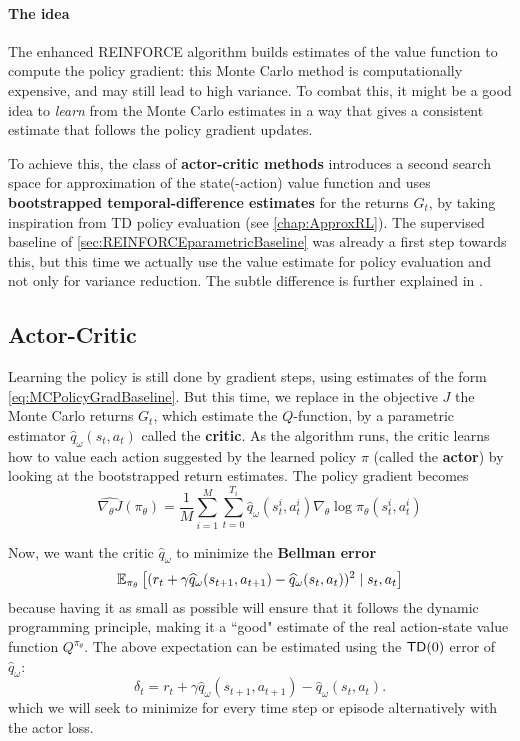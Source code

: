 \documentclass[../course-notes.tex]{subfiles}
\begin{document}
\paragraph{The idea} The enhanced REINFORCE algorithm builds estimates of the value function to compute the policy gradient: this Monte Carlo method is computationally expensive, and may still lead to high variance. To combat this, it might be a good idea to \textit{learn} from the Monte Carlo estimates in a way that gives a consistent estimate that follows the policy gradient updates.

To achieve this, the class of \textbf{\bluefont actor-critic methods} introduces a second search space for approximation of the state(-action) value function and uses \textbf{bootstrapped temporal-difference estimates} for the returns $G_t$, by taking inspiration from TD policy evaluation (see \cref{chap:ApproxRL}). The supervised baseline of \cref{sec:REINFORCEparametricBaseline} was already a first step towards this, but this time we actually use the value estimate for policy evaluation and not only for variance reduction. The subtle difference is further explained in \cite[chap.\ 13.5]{Sutton1998}.

\subsection{Actor-Critic}


Learning the policy is still done by gradient steps, using estimates of the form \cref{eq:MCPolicyGradBaseline}. But this time, we replace in the objective $J$ the Monte Carlo returns $G_t$, which estimate the $Q$-function, by a parametric estimator $\widehat{q}_\omega(s_t, a_t)$ called the \textbf{\bluefont critic}. As the algorithm runs, the critic learns how to value each action suggested by the learned policy $\pi$ (called the \textbf{\bluefont actor}) by looking at the bootstrapped return estimates. The policy gradient becomes
\begin{equation}\label{eq:ActorPolicyGrad}
\widehat{\nabla_\theta J}(\pi_\theta) =
\frac{1}{M}\sum_{i=1}^M
\sum_{t=0}^{T_i} \widehat{q}_\omega(s^i_t,a^i_t)
\nabla_\theta \log\pi_\theta(s^i_t, a^i_t)
\end{equation}

Now, we want the critic $\widehat{q}_\omega$ to minimize the \textbf{Bellman error}
\[
\operatorname{\mathbb{E}}_{\pi_\theta}\left[
(r_t + \gamma\widehat{q}_\omega(s_{t+1}, a_{t+1}) - \widehat{q}_\omega(s_t,a_t))^2
\mid s_t, a_t
\right]
\]
because having it as small as possible will ensure that it follows the dynamic programming principle, making it a ``good" estimate of the real action-state value function $Q^{\pi_\theta}$. The above expectation can be estimated using the $\mathsf{TD}(0)$ error of $\widehat{q}_\omega$:
\[
\delta_t = r_t + \gamma\widehat{q}_\omega(s_{t+1}, a_{t+1}) - \widehat{q}_\omega(s_t,a_t).
\]
which we will seek to minimize for every time step or episode alternatively with the actor loss.
\end{document}
